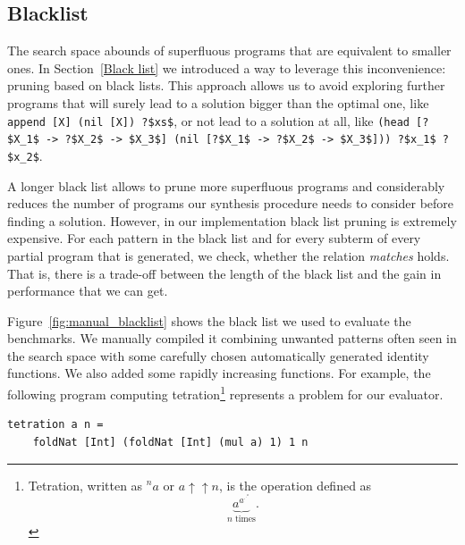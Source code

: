 \subsection{Blacklist}
The search space abounds of superfluous programs that are equivalent to smaller ones. In Section~\ref{Black list} we introduced a way to leverage this inconvenience: pruning based on black lists. This approach allows us to avoid exploring further programs that will surely lead to a solution bigger than the optimal one, like \lstinline!append [X] (nil [X]) ?$xs$!, or not lead to a solution at all, like \lstinline!(head [?$X_1$ -> ?$X_2$ -> $X_3$] (nil [?$X_1$ -> ?$X_2$ -> $X_3$])) ?$x_1$ ?$x_2$!.

A longer black list allows to prune more superfluous programs and considerably reduces the number of programs our synthesis procedure needs to consider before finding a solution. However, in our implementation black list pruning is extremely expensive. For each pattern in the black list and for every subterm of every partial program that is generated, we check, whether the relation \textit{matches} holds. That is, there is a trade-off between the length of the black list and the gain in performance that we can get.

Figure~\ref{fig:manual_blacklist} shows the black list  we used to evaluate the benchmarks. We manually compiled it combining unwanted patterns often seen in the search space with some carefully chosen automatically generated identity functions. We also added some rapidly increasing functions. For example, the following program computing tetration\footnote{Tetration, written as $^{n}a$ or $a \uparrow\uparrow n$, is the operation defined as \[\underbrace{a^{a^{.^{.^a}}}}_{n \text{ times}}.\]} represents a problem for our evaluator.
\begin{lstlisting}[style=plain]
tetration a n =
    foldNat [Int] (foldNat [Int] (mul a) 1) 1 n
\end{lstlisting}


